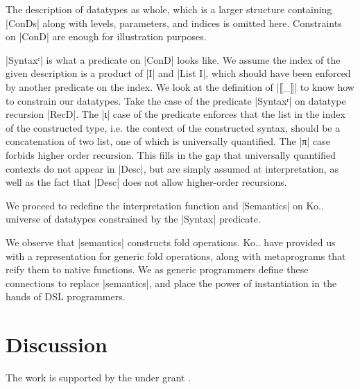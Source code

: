 \documentclass[sigplan,review,fleqn]{acmart}
\renewcommand{\verb}{\collectverb{\color{AgdaFunction}}}
\newcommand{\con}{\collectverb{\color{AgdaInductiveConstructor}}}
\begin{document}
The description of datatypes as whole, which is a larger structure containing \verb|ConDs| along with levels, parameters, and indices is omitted here.
Constraints on \verb|ConD| are enough for illustration purposes.

\verb|Syntaxᶜ| is what a predicate on \verb|ConD| looks like.
We assume the index of the given description is a product of \verb|I| and \verb|List I|, which should have been enforced by another predicate on the index.
We look at the definition of \verb|⟦_⟧| to know how to constrain our datatypes.
Take the case of the predicate \verb|Syntaxʳ| on datatype recursion \verb|RecD|.
The \con|ι| case of the predicate enforces that the list in the index of the constructed type, i.e. the context of the constructed syntax, should be a concatenation of two list, one of which is universally quantified.
The \con|π| case forbids higher order recursion.
This fills in the gap that universally quantified contexts do not appear in \verb|Desc|, but are simply assumed at interpretation, as well as the fact that \verb|Desc| does not allow higher-order recursions.

We proceed to redefine the interpretation function and \verb|Semantics| on Ko.. universe of datatypes constrained by the \verb|Syntax| predicate.

We observe that \verb|semantics| constructs fold operations.
Ko.. have provided us with a representation for generic fold operations, along with metaprograms that reify them to native functions.
We as generic programmers define these connections to replace \verb|semantics|, and place the power of instantiation in the hands of DSL programmers.


\section{Discussion}

\begin{acks}
The work is supported by the  under grant .
\end{acks}
\end{document}
